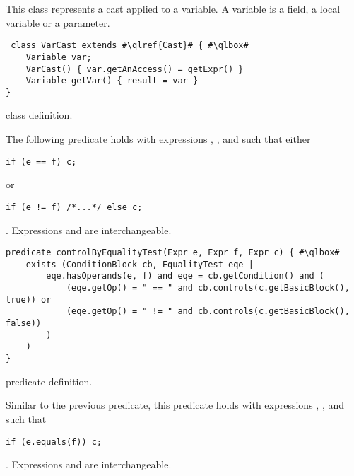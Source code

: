 This class represents a cast applied to a variable.
A \ql{} variable is a field, a local variable or a parameter.

\begin{listing}
\begin{verbatim}
 class VarCast extends #\qlref{Cast}# { #\qlbox#
	Variable var;
	VarCast() { var.getAnAccess() = getExpr() }
	Variable getVar() { result = var }
}
\end{verbatim}
\caption{ class definition.}
\label{lst:ql:VarCast}
\end{listing}

The following predicate holds with expressions , , and  such that either

\noindent%
\begin{minipage}{0.205\textwidth}
\begin{verbatim}
if (e == f) c;
\end{verbatim}
\end{minipage} or
\begin{minipage}{0.36\textwidth}
\begin{verbatim}
if (e != f) /*...*/ else c;
\end{verbatim}
\end{minipage}.
Expressions  and  are interchangeable.

\begin{listing}
\begin{verbatim}	
predicate controlByEqualityTest(Expr e, Expr f, Expr c) { #\qlbox#
	exists (ConditionBlock cb, EqualityTest eqe |
		eqe.hasOperands(e, f) and eqe = cb.getCondition() and (
			(eqe.getOp() = " == " and cb.controls(c.getBasicBlock(), true)) or
			(eqe.getOp() = " != " and cb.controls(c.getBasicBlock(), false))
		)
	)
}
\end{verbatim}
\caption{ predicate definition.}
\label{lst:ql:controlByEqualityTest}
\end{listing}

Similar to the previous predicate,
this predicate holds with expressions , , and  such that 
\noindent%
\begin{minipage}{0.26\textwidth}
\begin{verbatim}
if (e.equals(f)) c;
\end{verbatim}
\end{minipage}.
Expressions  and  are interchangeable.

